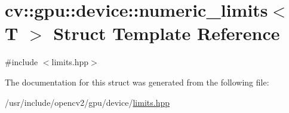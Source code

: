 \hypertarget{structcv_1_1gpu_1_1device_1_1numeric__limits}{\section{cv\-:\-:gpu\-:\-:device\-:\-:numeric\-\_\-limits$<$ T $>$ Struct Template Reference}
\label{structcv_1_1gpu_1_1device_1_1numeric__limits}
}


{\ttfamily \#include $<$limits.\-hpp$>$}



The documentation for this struct was generated from the following file\-:\begin{DoxyCompactItemize}
\item 
/usr/include/opencv2/gpu/device/\hyperlink{limits_8hpp}{limits.\-hpp}\end{DoxyCompactItemize}
